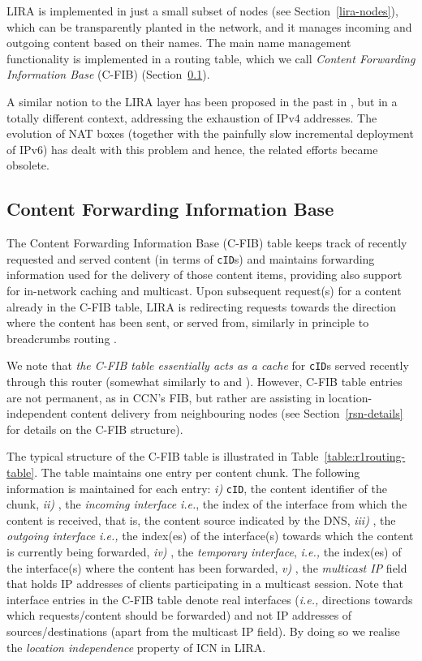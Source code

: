 \documentclass{sig-alternate}
\newcommand{\ie}{{\em i.e.,\/ }}
\begin{document}
LIRA is implemented in just a small subset of nodes (see Section~\ref{lira-nodes}), which can be transparently planted in the network, and it manages incoming and outgoing content based on their names. The main name management functionality is implemented in a routing table, which we call \textit{Content Forwarding Information Base} (C-FIB) (Section~\ref{rsn-table}).

A similar notion to the LIRA layer has been proposed in the past in \cite{triad}, but in a totally different context, addressing the exhaustion of IPv4 addresses. The evolution of NAT boxes (together with the painfully slow incremental deployment of IPv6) has dealt with this problem and hence, the related efforts became obsolete.

\subsection{Content Forwarding Information Base}\label{rsn-table}

The Content Forwarding Information Base (C-FIB) table keeps track of recently requested and served content (in terms of \texttt{cID}s) and maintains forwarding information used for the delivery of those content items, providing also support for in-network caching and multicast. Upon subsequent request(s) for a content already in the C-FIB table, LIRA is redirecting requests towards the direction where the content has been sent, or served from, similarly in principle to breadcrumbs routing \cite{breadcrumbs}.

We note that \textit{the C-FIB table essentially acts as a cache} for \texttt{cID}s served recently through this router (somewhat similarly to \cite{scan} and \cite{conet-comnet}). However, C-FIB table entries are not permanent, as in CCN's FIB, but rather are assisting in location-independent content delivery from neighbouring nodes (see Section~\ref{rsn-details} for details on the C-FIB structure).

The typical structure of the C-FIB table is illustrated in Table~\ref{table:r1routing-table}. The table maintains one entry per content chunk. The following information is maintained for each entry: \textit{i)} \texttt{cID}, the content identifier of the chunk, \textit{ii)} , the \textit{incoming interface} \textit{i.e.}, the index of the interface from which the content is received, that is, the content source indicated by the DNS, \textit{iii)} , the \textit{outgoing interface} \ie the index(es) of the interface(s) towards which the content is currently being forwarded, \textit{iv)} , the \textit{temporary interface}, \ie the index(es) of the interface(s) where the content has been forwarded, \textit{v)} , the \textit{multicast IP} field that holds IP addresses of clients participating in a multicast session.
Note that interface entries in the C-FIB table denote real interfaces (\ie directions towards which requests/content should be forwarded) and not IP addresses of sources/destinations (apart from the multicast IP field). By doing so we realise the \textit{location independence} property of ICN in LIRA.
\end{document}
